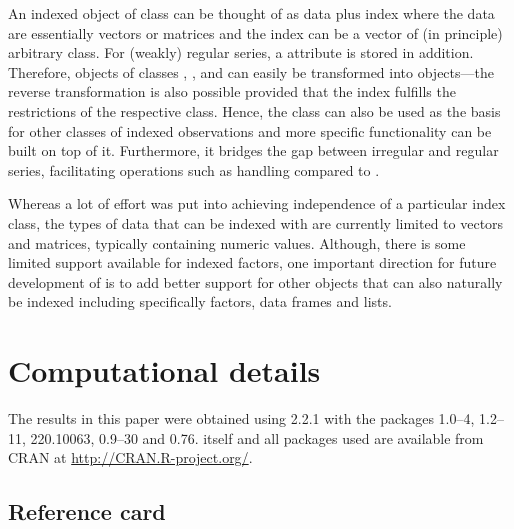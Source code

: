 \documentclass{Z}
\begin{document}
An indexed object of class  can be thought of as data plus index
where the data are essentially vectors or matrices and the index can be
a vector of (in principle) arbitrary class. For (weakly) regular 
series, a  attribute is stored in addition. Therefore, objects of classes
, ,  and  can easily
be transformed into  objects---the reverse transformation is also possible 
provided that the index fulfills the restrictions of the respective class.
Hence, the  class can also be used as the basis for other
classes of indexed observations and more specific functionality can be built on
top of it. Furthermore, it bridges the gap between irregular and regular series,
facilitating operations such as  handling compared to .

Whereas a lot of effort was put into achieving independence of a particular
index class, the types of data that can be indexed with  are currently
limited to vectors and matrices, typically containing numeric values. Although,
there is some limited support available for indexed factors, one important 
direction for future development of  is to add better support for other
objects that can also naturally be indexed including specifically factors, data
frames and lists.



\section*{Computational details}

The results in this paper were obtained using 
2.2.1 with the packages
 1.0--4,
 1.2--11,
 220.10063,
 0.9--30 and
 0.76.
 itself and all packages used are available from
CRAN at \url{http://CRAN.R-project.org/}.




\newpage

\begin{appendix}
\section{Reference card}

\end{appendix}
\end{document}
